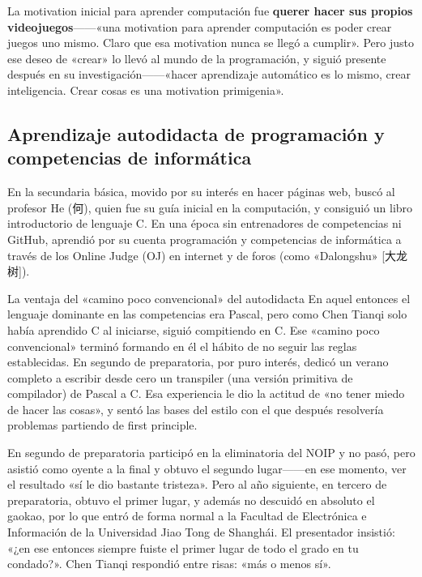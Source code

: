 \documentclass[a4paper]{article}
\begin{document}
La motivation inicial para aprender computación fue \textbf{querer hacer sus propios videojuegos}------«una motivation para aprender computación es poder crear juegos uno mismo. Claro que esa motivation nunca se llegó a cumplir». Pero justo ese deseo de «crear» lo llevó al mundo de la programación, y siguió presente después en su investigación------«hacer aprendizaje automático es lo mismo, crear inteligencia. Crear cosas es una motivation primigenia».

\subsection{Aprendizaje autodidacta de programación y competencias de informática}

En la secundaria básica, movido por su interés en hacer páginas web, buscó al profesor He (何), quien fue su guía inicial en la computación, y consiguió un libro introductorio de lenguaje C. En una época sin entrenadores de competencias ni GitHub, aprendió por su cuenta programación y competencias de informática a través de los Online Judge (OJ) en internet y de foros (como «Dalongshu» [大龙树]).

\begin{knowledgebox}{La ventaja del «camino poco convencional» del autodidacta}
En aquel entonces el lenguaje dominante en las competencias era Pascal, pero como Chen Tianqi solo había aprendido C al iniciarse, siguió compitiendo en C. Ese «camino poco convencional» terminó formando en él el hábito de no seguir las reglas establecidas. En segundo de preparatoria, por puro interés, dedicó un verano completo a escribir desde cero un transpiler (una versión primitiva de compilador) de Pascal a C. Esa experiencia le dio la actitud de «no tener miedo de hacer las cosas», y sentó las bases del estilo con el que después resolvería problemas partiendo de first principle.
\end{knowledgebox}

En segundo de preparatoria participó en la eliminatoria del NOIP y no pasó, pero asistió como oyente a la final y obtuvo el segundo lugar------en ese momento, ver el resultado «sí le dio bastante tristeza». Pero al año siguiente, en tercero de preparatoria, obtuvo el primer lugar, y además no descuidó en absoluto el gaokao, por lo que entró de forma normal a la Facultad de Electrónica e Información de la Universidad Jiao Tong de Shanghái. El presentador insistió: «¿en ese entonces siempre fuiste el primer lugar de todo el grado en tu condado?». Chen Tianqi respondió entre risas: «más o menos sí».
\end{document}

